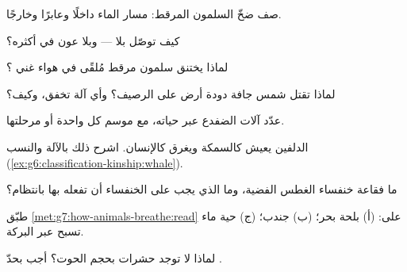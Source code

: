 \begin{exercise}[$\star$]\label{exo:g7:how-animals-breathe:3}
صف ضخّ السلمون المرقط: مسار الماء داخلًا وعابرًا وخارجًا.
\end{exercise}

\begin{exercise}[$\star$]\label{exo:g7:how-animals-breathe:4}
كيف توصّل   بلا  --- وبلا عون  في أكثره؟
\end{exercise}

\begin{exercise}[$\star$]\label{exo:g7:how-animals-breathe:5}
لماذا يختنق سلمون مرقط مُلقًى في هواء غني ؟
\end{exercise}

\begin{exercise}[$\star$]\label{exo:g7:how-animals-breathe:6}
لماذا تقتل شمس جافة دودة أرض على الرصيف؟ وأي آلة تخفق، وكيف؟
\end{exercise}

\begin{exercise}[$\star\star$]\label{exo:g7:how-animals-breathe:7}
عدّد آلات  الضفدع عبر حياته، مع موسم كل واحدة أو مرحلتها.
\end{exercise}

\begin{exercise}[$\star\star$]\label{exo:g7:how-animals-breathe:8}
الدلفين يعيش كالسمكة ويغرق كالإنسان. اشرح ذلك بالآلة والنسب
(\cref{ex:g6:classification-kinship:whale}).
\end{exercise}

\begin{exercise}[$\star\star$]\label{exo:g7:how-animals-breathe:9}
ما فقاعة خنفساء الغطس الفضية، وما الذي يجب على الخنفساء أن تفعله
بها بانتظام؟
\end{exercise}

\begin{exercise}[$\star\star$]\label{exo:g7:how-animals-breathe:10}
طبّق \cref{met:g7:how-animals-breathe:read} على: (أ) بلحة بحر؛
(ب) جندب؛ (ج) حية ماء تسبح عبر البركة.
\end{exercise}

\begin{exercise}[$\star\star$]\label{exo:g7:how-animals-breathe:11}
لماذا لا توجد حشرات بحجم الحوت؟ أجب بحدّ .
\end{exercise}

